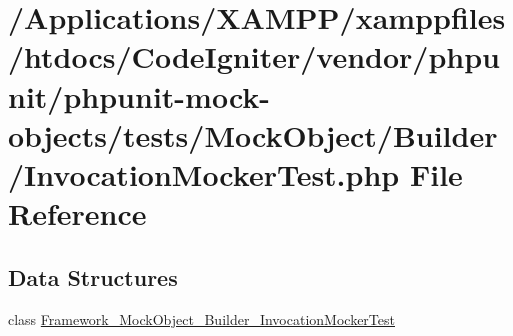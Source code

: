 \hypertarget{_invocation_mocker_test_8php}{}\section{/\+Applications/\+X\+A\+M\+P\+P/xamppfiles/htdocs/\+Code\+Igniter/vendor/phpunit/phpunit-\/mock-\/objects/tests/\+Mock\+Object/\+Builder/\+Invocation\+Mocker\+Test.php File Reference}
\label{_invocation_mocker_test_8php}
\subsection*{Data Structures}
\begin{DoxyCompactItemize}
\item 
class \mbox{\hyperlink{class_framework___mock_object___builder___invocation_mocker_test}{Framework\+\_\+\+Mock\+Object\+\_\+\+Builder\+\_\+\+Invocation\+Mocker\+Test}}
\end{DoxyCompactItemize}
